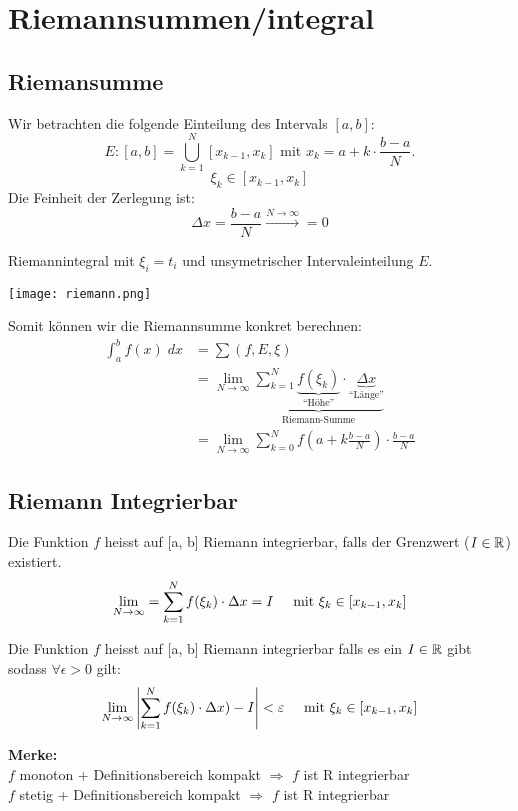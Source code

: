 \section{Riemannsummen/integral}
\subsection{Riemansumme}
Wir betrachten die folgende Einteilung des Intervals $[a,b]$:\[
E: [a,b] = \bigcup_{k=1}^{N}[x_{k-1}, x_k] \text{ mit } x_k = a + k \cdot \frac{b-a}{N}.
\]
\[
	\xi_k \in [x_{k-1}, x_k]
\]
Die Feinheit der Zerlegung ist:
\[
\Delta x = \frac{b-a}{N} \xrightarrow{N \to \infty} = 0
\]


\begin{minipage}{0.4\columnwidth}
	Riemannintegral mit $\xi_i = t_i$ und unsymetrischer Intervaleinteilung $E$.
\end{minipage}
\begin{minipage}{0.60\columnwidth}
	\texttt{[image: riemann.png]}
\end{minipage}

Somit können wir die Riemannsumme konkret berechnen:
\begin{align*}
\int_a^b f(x)\;dx &=\sum (f,E,\xi)\\
&= \lim_{N \to \infty} \underbrace{\sum_{k=1}^{N}
	\underbrace{f(\xi_k)}_{\text{``Höhe''}} \cdot \underbrace{\Delta x}_{\text{``Länge''}}}_{\text{Riemann-Summe}}\\
&= \lim_{N \to \infty} \sum_{k=0}^{N} {f(a + k\frac{b-a}{N})} \cdot \frac{b-a}{N}
\end{align*}


\subsection{Riemann Integrierbar}
\begin{definition}  Die Funktion $f$ heisst auf [a, b] Riemann integrierbar, falls der Grenzwert ($I \in \R$) existiert.
\[
	\lim_{N \to \infty} = \sum_{k = 1}^N f(\xi_k) \cdot \Delta x = I \hspace{0.5cm} \text{mit } \xi_k \in [x_{k-1}, x_k]
\]
\end{definition}

\begin{definition} 
Die Funktion $f$ heisst auf [a, b] Riemann integrierbar falls es ein $I \in \R$ gibt sodass $\forall \epsilon > 0$ gilt:
\[
	\lim_{N \to \infty} \left| \sum_{k = 1}^N f(\xi_k) \cdot \Delta x) - I \right| < \epsilon \hspace{0.5cm} \text{mit } \xi_k \in [x_{k-1}, x_k]
\]
\end{definition}
\textbf{Merke:}\\
$f$ monoton + Definitionsbereich kompakt $\Rightarrow$ $f$ ist R integrierbar\\
$f$ stetig + Definitionsbereich kompakt $\Rightarrow$ $f$ ist R integrierbar

